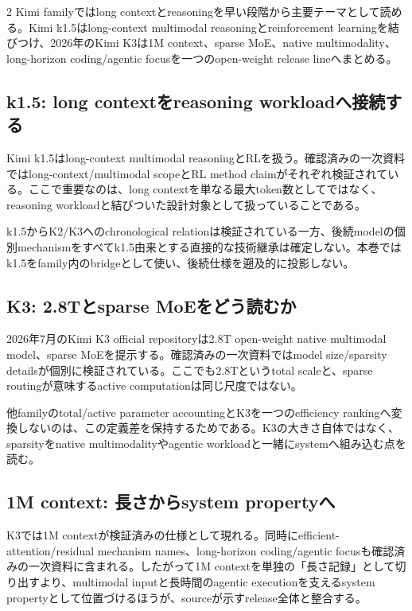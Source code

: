 \documentclass[lualatex,a4paper,10pt]{jlreq}
\begin{document}
\begin{multicols}{2}
\raggedcolumns
Kimi familyではlong contextとreasoningを早い段階から主要テーマとして読める。Kimi k1.5はlong-context multimodal reasoningとreinforcement learningを結びつけ、2026年のKimi K3は1M context、sparse MoE、native multimodality、long-horizon coding/agentic focusを一つのopen-weight release lineへまとめる。\autocite{kimik15,kimik3}

\subsection{k1.5: long contextをreasoning workloadへ接続する}
Kimi k1.5はlong-context multimodal reasoningとRLを扱う。確認済みの一次資料ではlong-context/multimodal scopeとRL method claimがそれぞれ検証されている。ここで重要なのは、long contextを単なる最大token数としてではなく、reasoning workloadと結びついた設計対象として扱っていることである。\autocite{kimik15}

k1.5からK2/K3へのchronological relationは検証されている一方、後続modelの個別mechanismをすべてk1.5由来とする直接的な技術継承は確定しない。本巻ではk1.5をfamily内のbridgeとして使い、後続仕様を遡及的に投影しない。

\subsection{K3: 2.8Tとsparse MoEをどう読むか}
2026年7月のKimi K3 official repositoryは2.8T open-weight native multimodal model、sparse MoEを提示する。確認済みの一次資料ではmodel size/sparsity detailsが個別に検証されている。ここでも2.8Tというtotal scaleと、sparse routingが意味するactive computationは同じ尺度ではない。\autocite{kimik3}

他familyのtotal/active parameter accountingとK3を一つのefficiency rankingへ変換しないのは、この定義差を保持するためである。K3の大きさ自体ではなく、sparsityをnative multimodalityやagentic workloadと一緒にsystemへ組み込む点を読む。

\subsection{1M context: 長さからsystem propertyへ}
K3では1M contextが検証済みの仕様として現れる。同時にefficient-attention/residual mechanism names、long-horizon coding/agentic focusも確認済みの一次資料に含まれる。したがって1M contextを単独の「長さ記録」として切り出すより、multimodal inputと長時間のagentic executionを支えるsystem propertyとして位置づけるほうが、sourceが示すrelease全体と整合する。\autocite{kimik3}


\end{multicols}
\end{document}
